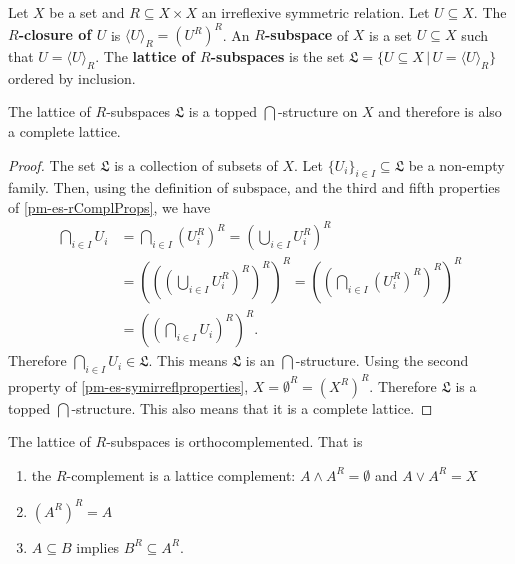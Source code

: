 \begin{mathSection}
	\begin{defn}
		Let $X$ be a set and $R \subseteq X \times X$ an irreflexive symmetric relation. Let $U \subseteq X$. The \textbf{$R$-closure of $U$} is $\langle U \rangle_R = (U^{R})^{R}$. An \textbf{$R$-subspace} of $X$ is a set $U \subseteq X$ such that $U = \langle U \rangle_R$. The \textbf{lattice of $R$-subspaces} is the set $\mathfrak{L} = \{ U \subseteq X \, | \, U = \langle U \rangle_R \}$ ordered by inclusion.
	\end{defn}
	
	\begin{coro}
		The lattice of $R$-subspaces $\mathfrak{L}$ is a topped $\bigcap$-structure on $X$ and therefore is also a complete lattice.
	\end{coro}
	\begin{proof}
		The set $\mathfrak{L}$ is a collection of subsets of $X$. Let $\{U_i\}_{i \in I} \subseteq \mathfrak{L}$ be a non-empty family. Then, using the definition of subspace, and the third and fifth properties of \ref{pm-es-rComplProps}, we have
		\begin{align*}
			\bigcap_{i \in I} U_i &= \bigcap_{i \in I} (U_i^{R})^{R} = (\bigcup_{i \in I} U_i^{R})^{R} \\
			&= (((\bigcup_{i \in I} U_i^{R})^{R})^{R})^{R} = ((\bigcap_{i \in I} (U_i^{R})^{R})^{R})^{R} \\
			&= ((\bigcap_{i \in I} U_i)^{R})^{R}.
		\end{align*}
		Therefore $\bigcap_{i \in I} U_i \in \mathfrak{L}$. This means $\mathfrak{L}$ is an $\bigcap$-structure. Using the second property of \ref{pm-es-symirreflproperties}, $X = \emptyset^{R} = (X^{R})^{R}$. Therefore $\mathfrak{L}$ is a topped $\bigcap$-structure. This also means that it is a complete lattice.
	\end{proof}
	
	\begin{prop}
		The lattice of $R$-subspaces is orthocomplemented. That is
		\begin{enumerate}
			\item the $R$-complement is a lattice complement: $A \wedge A^{R} = \emptyset$ and $A \vee A^{R} = X$
			\item $(A^{R})^{R} = A$
			\item $A \subseteq B$ implies $B^{R} \subseteq A^{R}$.
		\end{enumerate}
	\end{prop}
	

\end{mathSection}
